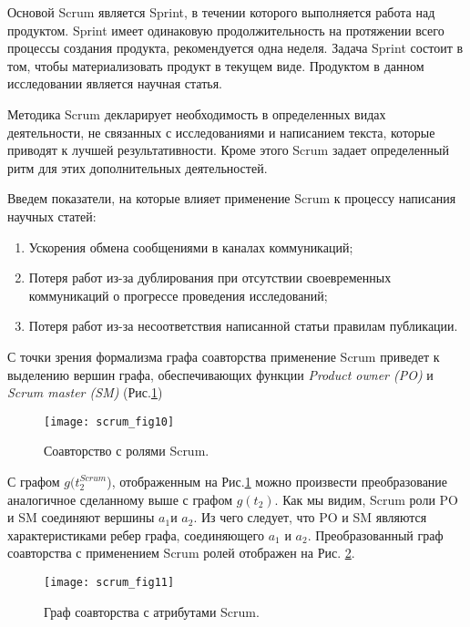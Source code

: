 Основой Scrum является Sprint, в течении которого выполняется работа над продуктом. 
Sprint имеет одинаковую продолжительность на протяжении всего процессы создания продукта, рекомендуется одна неделя. 
Задача Sprint состоит в том, чтобы материализовать продукт в текущем виде. 
Продуктом в данном исследовании является научная статья.

Методика Scrum декларирует необходимость в определенных видах деятельности, не связанных с исследованиями и написанием текста, которые приводят к лучшей результативности. 
Кроме этого Scrum задает определенный ритм для этих дополнительных деятельностей.

Введем показатели, на которые влияет применение Scrum к процессу написания научных статей:

\begin{enumerate}
\tightlist
  \item   Ускорения обмена сообщениями в каналах коммуникаций;
  \item   Потеря работ из-за дублирования при отсутствии своевременных коммуникаций о прогрессе проведения исследований;
  \item   Потеря работ из-за несоответствия написанной статьи правилам  публикации.
\end{enumerate}

С точки зрения формализма графа соавторства применение Scrum приведет к выделению вершин графа, обеспечивающих функции \emph{Product owner (PO)} и \emph{Scrum master (SM)} (Рис.\ref{ex:fig10})

\begin{figure}[H]
  \centering
    \texttt{[image: scrum\_fig10]}
  \caption{Соавторство с ролями Scrum.}
  \label{ex:fig10}
\end{figure}  

С графом $g(t_2^{Scrum}$), отображенным на Рис.\ref{ex:fig10} можно произвести преобразование аналогичное сделанному выше с графом $g(t_2)$. 
Как мы видим, Scrum роли PO и SM соединяют вершины $a_1$и $a_2$. 
Из чего следует, что PO и SM являются характеристиками ребер графа, соединяющего $a_1$ и $a_2$. 
Преобразованный граф соавторства с применением Scrum ролей отображен на Рис. \ref{ex:fig11}.

\begin{figure}[H]
  \centering
    \texttt{[image: scrum\_fig11]}
  \caption{ Граф соавторства с атрибутами Scrum.}
  \label{ex:fig11}
\end{figure}  

